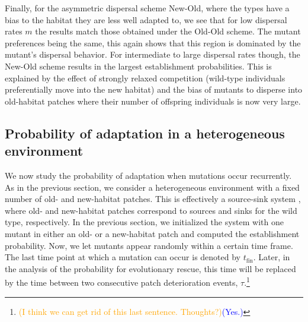 \documentclass[a4paper,11pt]{article}
\newcommand{\francois}[1]{\textcolor{blue}{(#1)}}
\newcommand{\pete}[1]{\textcolor{orange}{(#1)}}
\newcommand{\chg}[1]{\textcolor{change}{#1}}
\begin{document}
Finally, for the \chg{asymmetric dispersal scheme New-Old, where the types have a bias to the habitat they are less well adapted to, }we see that for low dispersal rates $m$ the results match those obtained under the \chg{Old-Old} scheme. The mutant preferences being the same, this again shows that this region is dominated by the mutant's dispersal behavior. For intermediate to large dispersal rates though, the \chg{New-Old} scheme results in the largest establishment probabilities. This is explained by the effect of strongly relaxed competition (wild-type individuals preferentially move into the new habitat) and the bias of mutants to disperse into old-habitat patches where their number of offspring individuals is now very large. %

\subsection*{Probability of adaptation in a heterogeneous environment} \label{subsec:source_sink}

We now study the probability of adaptation when mutations occur recurrently. As in the previous section, we consider a heterogeneous environment with a fixed number of old- and new-habitat patches. This is effectively a source-sink system \citep{holt_1985,pulliam_1988}, where old- and new-habitat patches correspond to sources and sinks for the wild type, respectively. In the previous section, we initialized the system with one mutant in either an old- or a new-habitat patch and computed the establishment probability. Now, we let mutants appear randomly within a certain time frame. The last time point at which a mutation can occur is denoted by $t_{\text{fin}}$.
Later, in the analysis of the probability for evolutionary rescue, this time will be replaced by the time between two consecutive patch deterioration events, $\tau$.\footnote{\pete{I think we can get rid of this last sentence. Thoughts?}\francois{Yes.}}
\end{document}
